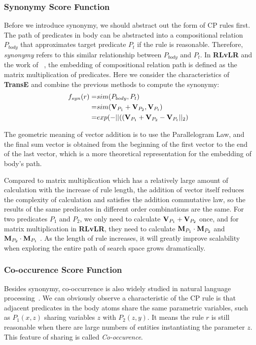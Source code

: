 \documentclass{article}
\begin{document}
	\subsubsection{Synonymy Score Function}
	Before we introduce synonymy, we should abstract out the form of CP rules first. The path of predicates in body can be abstracted into a compositional relation $P_{body}$ that approximates target predicate $P_t$ if the rule is reasonable. Therefore, \textit{synonymy} refers to this similar relationship between $P_{body}$ and $P_t$. In {\bf RLvLR} and the work of ~\cite{Yang:2015}, the embedding of compositional relation path is defined as the matrix multiplication of predicates. Here we consider the characteristics of {\bf TransE} and combine the previous methods to compute the synonymy:
	\begin{align}
		f_{syn}(r) = & sim(P_{body},P_t)\\
		= &sim({\bf V}_{P_1} + {\bf V}_{P_2}, {\bf V}_{P_t}) \nonumber\\
		= & exp(-||(({\bf V}_{P_1}+ {\bf V}_{P_2} - {\bf V}_{P_t}||_2) \nonumber
	\end{align}
	
	The geometric meaning of vector addition is to use the Parallelogram Law, and the final sum vector is obtained from the beginning of the first vector to the end of the last vector, which is a more theoretical representation for the embedding of body's path.
	
	Compared to matrix multiplication which has a relatively large amount of calculation with the increase of rule length, the addition of vector itself reduces the complexity of calculation and satisfies the addition commutative law, so the results of the same predicates in different order combinations are the same. For two predicates $P_1$ and $P_2$, we only need to calculate ${\bf V}_{P_1}+{\bf V}_{P_2}$ once, and for matrix multiplication in {\bf RLvLR}, they need to calculate ${\bf M}_{P_1}\cdot {\bf M}_{P_2}$ and ${\bf M}_{P_2}\cdot {\bf M}_{P_1}$ . As the length of rule increases, it will greatly improve scalability when exploring the entire path of search space grows dramatically.

	\subsubsection{Co-occurence Score Function}
	Besides synonymy, co-occurrence is also widely studied in natural language processing~\cite{Jones:Co-occurence}. We can obviously observe a characteristic of the CP rule is that adjacent predicates in the body atoms share the same parametric variables, such as $P_1(x,z)$ sharing variables $z$ with $P_2(z,y)$. It means the rule $r$ is still reasonable when there are large numbers of entities instantiating the parameter $z$. This feature of sharing is called \textit{Co-occurence}. 
	
\end{document}
